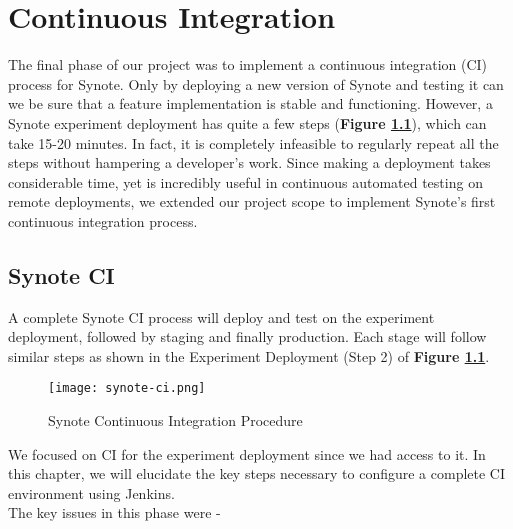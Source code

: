 \chapter{Continuous Integration}
\label{chap:continuous-integration}

The final phase of our project was to implement a continuous integration (CI) process for Synote. Only by deploying a new version of Synote and testing it can we be sure that a feature implementation is stable and functioning. However, a Synote experiment deployment has quite a few steps (\textbf{Figure \ref{fig:synote-ci-proc}}), which can take 15-20 minutes. In fact, it is completely infeasible to regularly repeat all the steps without hampering a developer's work. Since making a deployment takes  considerable time, yet is incredibly useful in continuous automated testing on remote deployments, we extended our project scope to implement Synote's first continuous integration process.

\section{Synote CI}
\label{sec:synote-ci}

A complete Synote CI process will deploy and test on the experiment deployment, followed by staging and finally production. Each stage will follow similar steps as shown in the Experiment Deployment (Step 2) of \textbf{Figure \ref{fig:synote-ci-proc}}.\\

\begin{figure}[!hbt]
  	\centering
 	\texttt{[image: synote-ci.png]}
  	\caption{Synote Continuous Integration Procedure}
 	\label{fig:synote-ci-proc}
\end{figure}

We focused on CI for the experiment deployment since we had access to it. In this chapter, we will elucidate the key steps necessary to configure a complete CI environment using Jenkins.\\

The key issues in this phase were -

